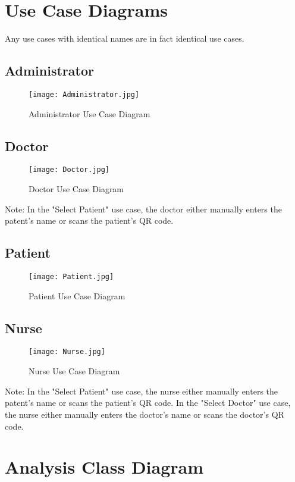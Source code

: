 \documentclass[12pt]{article}
\begin{document}
\section{Use Case Diagrams}
Any use cases with identical names are in fact identical use cases.
\subsection{Administrator}
\begin{figure}[h]
\texttt{[image: Administrator.jpg]}
\caption{Administrator Use Case Diagram}
\label{fig:jobInformationDialog}
\end{figure} 
\newpage
\subsection{Doctor}
\begin{figure}[h]
\texttt{[image: Doctor.jpg]}
\caption{Doctor Use Case Diagram}
\label{fig:jobInformationDialog}

\end{figure}
Note: In the "Select Patient" use case, the doctor either manually enters the patent's name or scans the patient's QR code.
\newpage
\subsection{Patient}
\begin{figure}[h]
\texttt{[image: Patient.jpg]}
\caption{Patient Use Case Diagram}
\label{fig:jobInformationDialog}

\end{figure}
\newpage
\subsection{Nurse}
\begin{figure}[h]
\texttt{[image: Nurse.jpg]}
\caption{Nurse Use Case Diagram}
\label{fig:jobInformationDialog}
\end{figure}
Note: In the "Select Patient" use case, the nurse either manually enters the patent's name or scans the patient's QR code. In the "Select Doctor" use case, the nurse either manually enters the doctor's name or scans the doctor's QR code.
\newpage
\section{Analysis Class Diagram\\}
\end{document}
